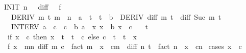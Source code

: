 \begin{isabellebody}
\ \ \ INIT{\isacharcolon}{\kern0pt}\ {\isachardoublequoteopen}n\ {\isachargreater}{\kern0pt}\ {}{\isachardoublequoteclose}\ {\isachardoublequoteopen}diff\ {}\ {\isacharequal}{\kern0pt}\ f{\isachardoublequoteclose}\isanewline
\ \ \ \ \ DERIV{\isacharcolon}{\kern0pt}\ {\isachardoublequoteopen}{\isasymforall}m\ t{\isachardot}{\kern0pt}\ m\ {\isacharless}{\kern0pt}\ n\ {\isasymand}\ a\ {\isasymle}\ t\ {\isasymand}\ t\ {\isasymle}\ b\ {\isasymlongrightarrow}\ DERIV\ {\isacharparenleft}{\kern0pt}diff\ m{\isacharparenright}{\kern0pt}\ t\ {\isacharcolon}{\kern0pt}{\isachargreater}{\kern0pt}\ diff\ {\isacharparenleft}{\kern0pt}Suc\ m{\isacharparenright}{\kern0pt}\ t{\isachardoublequoteclose}\isanewline
\ \ \ \ \ INTERV{\isacharcolon}{\kern0pt}\ {\isachardoublequoteopen}a\ {\isasymle}\ c\ {\isachardoublequoteclose}\ {\isachardoublequoteopen}c\ {\isasymle}\ b{\isachardoublequoteclose}\ {\isachardoublequoteopen}a\ {\isasymle}\ x{\isachardoublequoteclose}\ {\isachardoublequoteopen}x\ {\isasymle}\ b{\isachardoublequoteclose}\ {\isachardoublequoteopen}x\ {\isasymnoteq}\ c{\isachardoublequoteclose}\isanewline
\ \ \ {\isachardoublequoteopen}{\isasymexists}t{\isachardot}{\kern0pt}\isanewline
\ \ \ \ {\isacharparenleft}{\kern0pt}if\ x\ {\isacharless}{\kern0pt}\ c\ then\ x\ {\isacharless}{\kern0pt}\ t\ {\isasymand}\ t\ {\isacharless}{\kern0pt}\ c\ else\ c\ {\isacharless}{\kern0pt}\ t\ {\isasymand}\ t\ {\isacharless}{\kern0pt}\ x{\isacharparenright}{\kern0pt}\ {\isasymand}\isanewline
\ \ \ \ f\ x\ {\isacharequal}{\kern0pt}\ {\isacharparenleft}{\kern0pt}{\isasymSum}m{\isacharless}{\kern0pt}n{\isachardot}{\kern0pt}\ {\isacharparenleft}{\kern0pt}diff\ m\ c\ {\isacharslash}{\kern0pt}\ fact\ m{\isacharparenright}{\kern0pt}\ {\isacharasterisk}{\kern0pt}\ {\isacharparenleft}{\kern0pt}x\ {\isacharminus}{\kern0pt}\ c{\isacharparenright}{\kern0pt}{\isacharcircum}{\kern0pt}m{\isacharparenright}{\kern0pt}\ {\isacharplus}{\kern0pt}\ {\isacharparenleft}{\kern0pt}diff\ n\ t\ {\isacharslash}{\kern0pt}\ fact\ n{\isacharparenright}{\kern0pt}\ {\isacharasterisk}{\kern0pt}\ {\isacharparenleft}{\kern0pt}x\ {\isacharminus}{\kern0pt}\ c{\isacharparenright}{\kern0pt}{\isacharcircum}{\kern0pt}n{\isachardoublequoteclose}\isanewline
%
\isadelimproof
%
\endisadelimproof
%
\isatagproof
{}\isamarkupfalse%
\ {\isacharparenleft}{\kern0pt}cases\ {\isachardoublequoteopen}x\ {\isacharless}{\kern0pt}\ c{\isachardoublequoteclose}{\isacharparenright}{\kern0pt}\isanewline
\ \ \isamarkupfalse%

\end{isabellebody}
